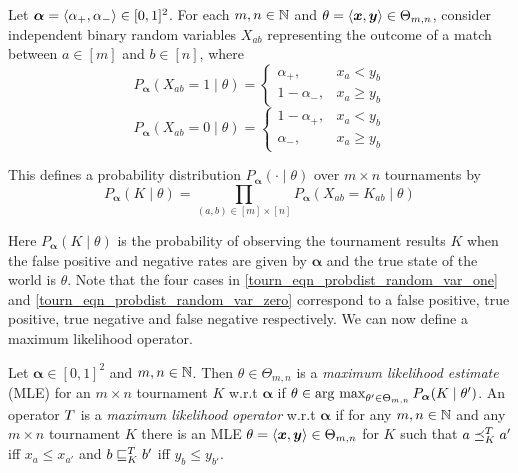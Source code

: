 \begin{definition}
   \label{tourn_def_probdist}

   Let $\bm{\alpha} = \langle {\alpha_+, \alpha_-} \rangle \in [0,1]^2$. For each $m,
   n \in \mathbb{N}$ and $\theta = \langle {\bm{x}, \bm{y}} \rangle \in \Theta_{m,n}$, consider
   independent binary random variables $X_{ab}$ representing the outcome of a
   match between $a \in [m]$ and $b \in [n]$, where
   \begin{equation}
        \label{tourn_eqn_probdist_random_var_one}
        P_{\bm{\alpha}}(X_{ab} = 1 \mid \theta)
        = \begin{cases}
            \alpha_+,& x_a < y_b \\
            1 - \alpha_-,& x_a \ge y_b
        \end{cases}
   \end{equation}
   \begin{equation}
        \label{tourn_eqn_probdist_random_var_zero}
        P_{\bm{\alpha}}(X_{ab} = 0 \mid \theta)
        = \begin{cases}
            1 - \alpha_+,& x_a < y_b \\
            \alpha_-,& x_a \ge y_b
        \end{cases}
   \end{equation}

   This defines a probability distribution $P_{\bm{\alpha}}({\cdot} \mid
   \theta)$ over $m \times n$ tournaments by
   \[
      P_{\bm{\alpha}}(K \mid \theta) = \prod_{(a, b) \in [m] \times [n]}{
           P_{\bm{\alpha}}(X_{ab} = K_{ab} \mid \theta)
      }
   \]
\end{definition}

Here $P_{\bm{\alpha}}(K \mid \theta)$ is the probability of observing the
tournament results $K$ when the false positive and negative rates are given by
$\bm{\alpha}$ and the true state of the world is $\theta$. Note that the
four cases in \cref{tourn_eqn_probdist_random_var_one} and
\cref{tourn_eqn_probdist_random_var_zero} correspond to a false positive, true
positive, true negative and false negative respectively. We can now define a
maximum likelihood operator.

\begin{definition}

    Let $\bm{\alpha} \in [0,1]^2$ and $m, n \in \mathbb{N}$. Then $\theta \in
    \Theta_{m,n}$ is a \emph{maximum likelihood estimate} (MLE) for an $m
    \times n$ tournament $K$ w.r.t $\bm{\alpha}$ if $\theta \in
    \operatorname*{arg\ max}_{\theta' \in \Theta_{m,n}}{P_{\bm{\alpha}}(K \mid \theta')}$. An
    operator $T$ is a \emph{maximum likelihood operator} w.r.t
    $\bm{\alpha}$ if for any $m, n \in \mathbb{N}$ and any $m \times n$ tournament $K$
    there is an MLE $\theta = \langle {\bm{x}, \bm{y}} \rangle \in \Theta_{m,n}$ for $K$
    such that $a \preceq_K^T a'$ iff $x_a \le x_{a'}$ and $b \sqsubseteq_K^T b'$
    iff $y_b \le y_{b'}$.

\end{definition}

